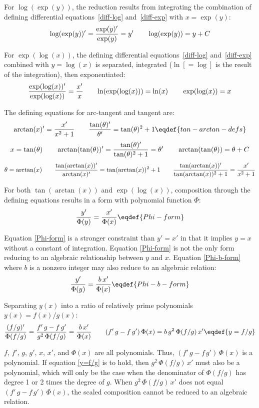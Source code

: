 For $\log(\exp(y))$, the reduction results from integrating the
combination of defining differential equations~\eqref{diff-log}
and~\eqref{diff-exp} with $x=\exp(y)$:
$${\log(\exp(y))'}={\exp(y)'\over\exp(y)}=y'
 \qquad \log(\exp(y))=y+C$$

For $\exp(\log(x))$, the defining differential equations~\eqref{diff-log}
and~\eqref{diff-exp} combined with $y=\log(x)$ is separated, integrated
($\ln[=\log]$ is the result of the integration), then exponentiated:
$${\exp(\log(x))'\over\exp(\log(x))}={x'\over x}
 \qquad{\ln(\exp(\log(x)))}=\ln(x)
 \qquad \exp(\log(x))=x$$

The defining equations for arc-tangent and tangent are:
$$\arctan(x)'={x'\over x^2+1}\qquad
 {\tan(\theta)'\over\theta'}=\tan(\theta)^2+1\eqdef{tan-arctan-defs}$$
$$x=\tan(\theta)\qquad
 \arctan(\tan(\theta))'={\tan(\theta)'\over\tan(\theta)^2+1}=\theta'
 \qquad \arctan(\tan(\theta))=\theta+C$$
$$\theta=\arctan(x)\qquad
 {\tan(\arctan(x))'\over\arctan(x)'}=\tan(\arctan(x))^2+1
 \qquad{\tan(\arctan(x))'\over\tan(\arctan(x))^2+1}={x'\over x^2+1}$$

For both $\tan(\arctan(x))$ and $\exp(\log(x))$, composition through
the defining equations results in a form with polynomial function
$\Phi$:
$${y'\over\Phi(y)}={x'\over\Phi(x)}\eqdef{Phi-form}$$

Equation \eqref{Phi-form} is a stronger constraint than $y'=x'$ in
that it implies $y=x$ without a constant of integration.
Equation \eqref{Phi-form} is not the only form reducing to an
algebraic relationship between $y$ and $x$.
Equation \eqref{Phi-b-form} where $b$ is a nonzero integer may also
reduce to an algebraic relation:
$${y'\over\Phi(y)}={b\,x'\over\Phi(x)}\eqdef{Phi-b-form}$$

Separating $y(x)$ into a ratio of relatively prime polynomials
$y(x)=f(x)/g(x)$:
$${(f/g)'\over\Phi(f/g)}=
   {f'\,g-f\,g'\over g^2\,\Phi(f/g)}={b\,x'\over\Phi(x)}\qquad
   ({f'\,g-f\,g'})\,{\Phi(x)}=b\,g^2\,\Phi(f/g)\,x'\eqdef{y=f/g}$$

$f$, $f'$, $g$, $g'$, $x$, $x'$, and $\Phi(x)$ are all polynomials.
Thus, $({f'\,g-f\,g'})\,{\Phi(x)}$ is a polynomial.  If
equation \eqref{y=f/g} is to hold, then $g^2\,\Phi(f/g)\,x'$ must also
be a polynomial, which will only be the case when the denominator of
$\Phi(f/g)$ has degree 1 or 2 times the degree of $g$.  When
$g^2\,\Phi(f/g)\,x'$ does not equal $({f'\,g-f\,g'})\,{\Phi(x)}$, the
scaled composition cannot be reduced to an algebraic relation.

